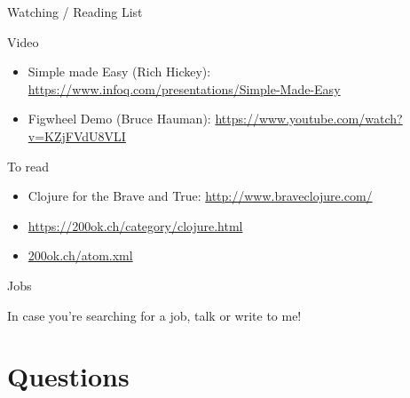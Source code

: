 \documentclass[bigger]{beamer}
\begin{document}
\begin{frame}[label=sec-4-2]{Watching / Reading List}
\begin{block}{Video}
\begin{itemize}
\item Simple made Easy (Rich Hickey): \url{https://www.infoq.com/presentations/Simple-Made-Easy}
\item Figwheel Demo (Bruce Hauman): \url{https://www.youtube.com/watch?v=KZjFVdU8VLI}
\end{itemize}
\end{block}

\begin{block}{To read}
\begin{itemize}
\item Clojure for the Brave and True: \url{http://www.braveclojure.com/}
\item \url{https://200ok.ch/category/clojure.html}
\item \href{https://200ok.ch/atom.xml}{200ok.ch/atom.xml}
\end{itemize}
\end{block}
\end{frame}

\begin{frame}[label=sec-4-3]{Jobs}
\begin{block}{In case you're searching for a job, talk or write to me!}
\end{block}
\end{frame}


\section{Questions}
\label{sec-5}
\end{document}

